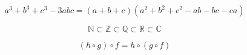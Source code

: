 \documentclass[%
    fontset=none,
    oneside,
]{ctexbook}
\providecommand*{\regularscript}{}
\renewcommand*{\regularscript}{\fontspec{LXGW WenKai Mono Light}\CJKfontspec{LXGW WenKai Mono Light}\selectfont}
\renewcommand*{\regularscript}{}
\newcommand*{\TextA}{今国意我永然警转酬随风鹰.}
\newcommand*{\TextC}{三今力國愛書東永袋酬鬱鷹.}
\newcommand*{\TextJ}{いろはにほへと ちりぬるを わかよたれそ つねならむ うゐのおくやま けふこえて あさきゆめみし ゑひもせす(ん).}
\newcommand*{\TextK}{키스의 고유조건은 입술끼리 만나야 하고 특별한 기술은 필요치 않다.}
\newcommand*{\TextD}{Pa's wijze lynx bezag vroom het fikse aquaduct.}
\newcommand*{\TextE}{Eble ĉiu kvazaŭ-deca fuŝĥoraĵo ĝojigos homtipon.}
\newcommand*{\TextU}{The quick brown fox jumped over the lazy dogs.}
\newcommand*{\TextG}{Ο καλύμνιος σφουγγαράς ψιθύρισε πως θα βουτήξει χωρίς να διστάζει.}
\newcommand*{\TextN}{9,876; 543,210.}
\newcommand*{\TextR}{Широкая электрификация южных губерний даст мощный толчок подъёму сельского хозяйства.}
\newcommand*{\Text}{%
    \TextA{}

    \TextC{}

    \TextJ{}

    \TextK{}

    \TextE{}


    \TextU{}

    \TextG{}

    \TextR{}

    \TextN{}%
}
\begin{document}



\normalfont

\endgroup

\begin{equation*}
    a^3 + b^3 + c^3 - 3abc
    = (a + b + c)(a^2 + b^2 + c^2 - ab - bc - ca)
\end{equation*}

\begin{equation*}
    \mathbb{N}
    \subset \mathbb{Z}
    \subset \mathbb{Q}
    \subset \mathbb{R}
    \subset \mathbb{C}
\end{equation*}

\begin{equation*}
    (h \circ g) \circ f = h \circ (g \circ f)
\end{equation*}
\end{document}
